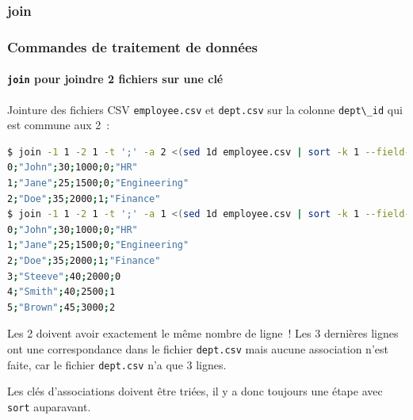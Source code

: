 \documentclass{beamer}
\begin{document}
    \subsubsection{join}\label{subsubsec:join}
    \begin{frame}[fragile]
        \transdissolve
        \frametitle{Commandes de traitement de données}
        \framesubtitle{\lstinline{join} pour joindre 2 fichiers sur une clé}
        Jointure des fichiers CSV \lstinline{employee.csv} et \lstinline{dept.csv} sur la colonne \lstinline{dept\_id} qui est commune aux 2~:
        \begin{lstlisting}[language=bash,basicstyle=\tiny\ttfamily]
$ join -1 1 -2 1 -t ';' -a 2 <(sed 1d employee.csv | sort -k 1 --field-separator=';') <(sed 1d dept.csv | sort -k 1 --field-separator=';')
0;"John";30;1000;0;"HR"
1;"Jane";25;1500;0;"Engineering"
2;"Doe";35;2000;1;"Finance"
$ join -1 1 -2 1 -t ';' -a 1 <(sed 1d employee.csv | sort -k 1 --field-separator=';') <(sed 1d dept.csv | sort -k 1 --field-separator=';')
0;"John";30;1000;0;"HR"
1;"Jane";25;1500;0;"Engineering"
2;"Doe";35;2000;1;"Finance"
3;"Steeve";40;2000;0
4;"Smith";40;2500;1
5;"Brown";45;3000;2
        \end{lstlisting}
        \begin{dangercolorbox}
            Les 2 doivent avoir exactement le même nombre de ligne~!
            Les 3 dernières lignes ont une correspondance dans le fichier \lstinline{dept.csv} mais aucune association n'est faite, car le fichier \lstinline{dept.csv} n'a que 3 lignes.

            Les clés d'associations doivent être triées, il y a donc toujours une étape avec \lstinline{sort} auparavant.
        \end{dangercolorbox}
    \end{frame}
\end{document}
